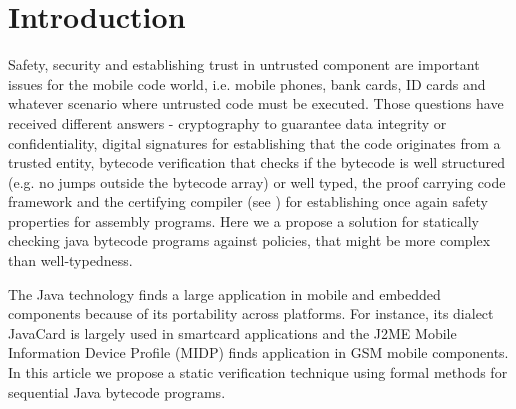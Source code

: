 
\section{Introduction}\label{intro}
Safety, security and establishing trust in untrusted component are important issues for the mobile code world, 
i.e. mobile phones, bank cards, ID cards and whatever scenario where 
untrusted code must be executed. Those questions have received different answers - cryptography to guarantee data integrity or confidentiality,
 digital signatures for establishing that the code originates from a trusted entity, bytecode verification that checks if the bytecode 
 is well structured (e.g. no jumps outside the bytecode array) or well typed, the proof carrying code framework  and the certifying compiler (see \cite{ComNec,DesNecLee98}) for establishing once again safety properties for assembly programs.  Here we a propose a solution for statically checking java bytecode programs against
 policies, that might be more complex than well-typedness.  



The Java technology finds a large application in mobile and embedded components because of its portability across platforms. 
For instance, its dialect JavaCard is largely used in smartcard applications and the J2ME Mobile Information Device Profile (MIDP) finds application in GSM mobile components. 
In this article we propose a static verification technique using formal methods for sequential Java bytecode programs.

